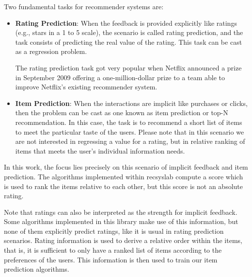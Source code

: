 Two fundamental tasks for recommender systems are:
\begin{itemize}
    \item \textbf{Rating Prediction}:
When the feedback is provided explicitly like ratings (e.g., stars in a 1 to 5 scale), the scenario is called rating prediction, and the task consists of predicting the real value of the rating. This task can be cast as a regression problem.
  
The rating prediction task got very popular when Netflix announced a prize~\cite{netflixprize}
in September 2009 offering a one-million-dollar prize to a team able to improve Netflix's existing recommender system.

    \item \textbf{Item Prediction}:
When the interactions are implicit like purchases or clicks, then the problem can be cast as one known as item prediction or top-N recommendation. In this case, the task is to recommend a short list of items to meet the particular taste of the users. Please note that in this scenario we are not interested in regressing a value for a rating, but in relative ranking of items that meets the user's individual information needs. 

\end{itemize}
In this work, the focus lies precisely on this scenario of implicit feedback and item prediction. The algorithms implemented within recsyslab compute a score which is used to rank the items relative to each other, but this score is not an absolute rating.

Note that ratings can also be interpreted as the strength for implicit feedback. Some algorithms implemented
in this library make use of this information, but none of them explicitly predict ratings, like it is usual in rating prediction scenarios. Rating information is used to derive a relative order within the items, that is, it is sufficient to only have a ranked list of items according to the preferences of the users. This information is then used to train our item prediction algorithms. 


